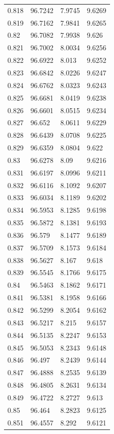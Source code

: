 \begin{tabular}{llll}
0.818 & 96.7242 & 7.9745 & 9.6269 \\
0.819 & 96.7162 & 7.9841 & 9.6265 \\
0.82 & 96.7082 & 7.9938 & 9.626 \\
0.821 & 96.7002 & 8.0034 & 9.6256 \\
0.822 & 96.6922 & 8.013 & 9.6252 \\
0.823 & 96.6842 & 8.0226 & 9.6247 \\
0.824 & 96.6762 & 8.0323 & 9.6243 \\
0.825 & 96.6681 & 8.0419 & 9.6238 \\
0.826 & 96.6601 & 8.0515 & 9.6234 \\
0.827 & 96.652 & 8.0611 & 9.6229 \\
0.828 & 96.6439 & 8.0708 & 9.6225 \\
0.829 & 96.6359 & 8.0804 & 9.622 \\
0.83 & 96.6278 & 8.09 & 9.6216 \\
0.831 & 96.6197 & 8.0996 & 9.6211 \\
0.832 & 96.6116 & 8.1092 & 9.6207 \\
0.833 & 96.6034 & 8.1189 & 9.6202 \\
0.834 & 96.5953 & 8.1285 & 9.6198 \\
0.835 & 96.5872 & 8.1381 & 9.6193 \\
0.836 & 96.579 & 8.1477 & 9.6189 \\
0.837 & 96.5709 & 8.1573 & 9.6184 \\
0.838 & 96.5627 & 8.167 & 9.618 \\
0.839 & 96.5545 & 8.1766 & 9.6175 \\
0.84 & 96.5463 & 8.1862 & 9.6171 \\
0.841 & 96.5381 & 8.1958 & 9.6166 \\
0.842 & 96.5299 & 8.2054 & 9.6162 \\
0.843 & 96.5217 & 8.215 & 9.6157 \\
0.844 & 96.5135 & 8.2247 & 9.6153 \\
0.845 & 96.5053 & 8.2343 & 9.6148 \\
0.846 & 96.497 & 8.2439 & 9.6144 \\
0.847 & 96.4888 & 8.2535 & 9.6139 \\
0.848 & 96.4805 & 8.2631 & 9.6134 \\
0.849 & 96.4722 & 8.2727 & 9.613 \\
0.85 & 96.464 & 8.2823 & 9.6125 \\
0.851 & 96.4557 & 8.292 & 9.6121 \\

\end{tabular}
